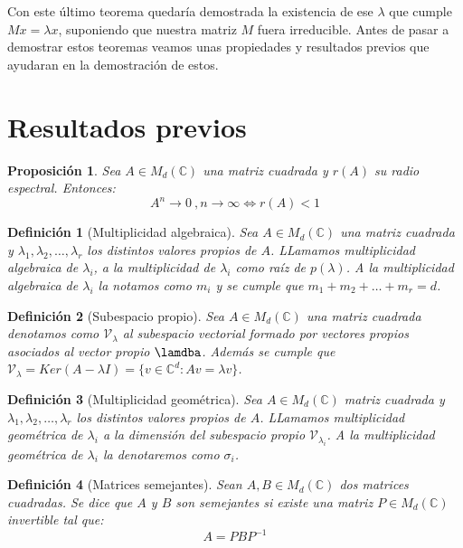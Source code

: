 \documentclass[size=a4, parskip=half, titlepage=false, toc=flat, toc=bib, 12pt]{scrartcl}
\theoremstyle{theorem-style}
\newtheorem{nprop}{Proposición}[section]
\theoremstyle{definition-style}
\newtheorem{ndef}{Definición}[section]
\theoremstyle{remark-style}
\theoremstyle{example-style}
\theoremstyle{definition-style}
\theoremstyle{remark-style}
\begin{document}
Con este último teorema quedaría demostrada la existencia de ese $\lambda$ que cumple $Mx = \lambda x$, suponiendo que nuestra matriz $M$ fuera irreducible. Antes de pasar a demostrar estos teoremas veamos unas propiedades y resultados previos que ayudaran en la demostración de estos.

\section{Resultados previos}

\begin{nprop}
\label{res1}
Sea $A \in M_d(\mathbb{C})$ una matriz cuadrada y $r(A)$ su radio espectral. Entonces:
$$A^n \rightarrow 0 \ ,  n \rightarrow \infty \Leftrightarrow r(A) < 1 $$
\end{nprop}

\begin{ndef}[Multiplicidad algebraica]
Sea $A \in M_d(\mathbb{C})$ una matriz cuadrada y $\lambda_1, \lambda_2, \dots, \lambda_r$ los distintos valores propios de $A$. LLamamos multiplicidad algebraica de $\lambda_i$, a la multiplicidad de $\lambda_i$ como raíz de $p(\lambda)$. A la multiplicidad algebraica de $\lambda_i$ la notamos como $m_i$ y se cumple que $m_1 + m_2 + \dots + m_r = d$.
\end{ndef}

\begin{ndef}[Subespacio propio]
Sea $A \in M_d(\mathbb{C})$ una matriz cuadrada denotamos como $\mathscr{V}_\lambda$ al subespacio vectorial formado por vectores propios asociados al vector propio $\lamdba$. Además se cumple que  $\mathscr{V}_\lambda = Ker(A - \lambda I) = \{ v \in \mathbb{C}^d : Av = \lambda v \}$.
\end{ndef}

\begin{ndef}[Multiplicidad geométrica]
Sea $A \in M_d(\mathbb{C})$ matriz cuadrada y $\lambda_1, \lambda_2, \dots, \lambda_r$ los distintos valores propios de $A$. LLamamos multiplicidad geométrica de $\lambda_i$ a la dimensión del subespacio propio $\mathscr{V}_\lambda_i$. A la multiplicidad geométrica de $\lambda_i$ la denotaremos como $\sigma_i$.
\end{ndef}

\begin{ndef}[Matrices semejantes]
Sean $A, B \in M_d(\mathbb{C})$ dos matrices cuadradas. Se dice que $A$ y $B$ son semejantes si existe una matriz $P \in M_d(\mathbb{C})$ invertible tal que:
$$A = P B P^{-1} $$
\end{ndef}
\end{document}
